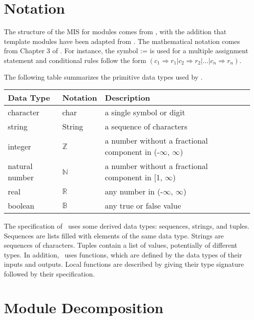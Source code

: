 \documentclass[12pt, titlepage]{article}
\begin{document}
\section{Notation}
The structure of the MIS for modules comes from \citet{HoffmanAndStrooper1995},
with the addition that template modules have been adapted from
\cite{GhezziEtAl2003}.  The mathematical notation comes from Chapter 3 of
\citet{HoffmanAndStrooper1995}.  For instance, the symbol := is used for a
multiple assignment statement and conditional rules follow the form $(c_1
\Rightarrow r_1 | c_2 \Rightarrow r_2 | ... | c_n \Rightarrow r_n )$.

The following table summarizes the primitive data types used by \progname. 

\begin{center}
\renewcommand{\arraystretch}{1.2}
\noindent 
\begin{tabular}{l l p{7.5cm}} 
\toprule 
\textbf{Data Type} & \textbf{Notation} & \textbf{Description}\\ 
\midrule
character & char & a single symbol or digit\\
string & String & a sequence of characters\\
integer & $\mathbb{Z}$ & a number without a fractional component in (-$\infty$, $\infty$) \\
natural number & $\mathbb{N}$ & a number without a fractional component in [1, $\infty$) \\
real & $\mathbb{R}$ & any number in (-$\infty$, $\infty$)\\
boolean & $\mathbb{B}$ & any true or false value\\
\bottomrule
\end{tabular} 
\end{center}

\noindent
The specification of \progname \ uses some derived data types: sequences, strings, and
tuples. Sequences are lists filled with elements of the same data type. Strings
are sequences of characters. Tuples contain a list of values, potentially of
different types. In addition, \progname \ uses functions, which
are defined by the data types of their inputs and outputs. Local functions are
described by giving their type signature followed by their specification.

\section{Module Decomposition}
\end{document}
